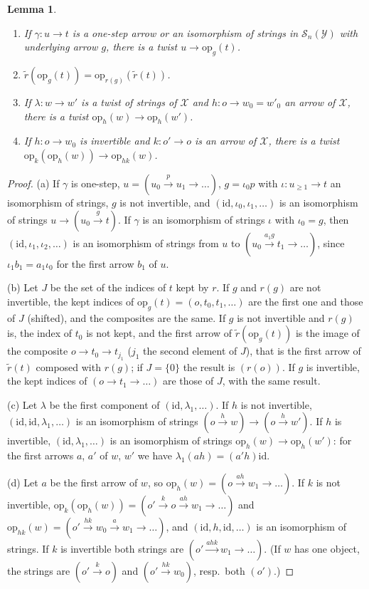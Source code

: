 \documentclass[11pt]{amsart}
\newtheorem{lem}[thm]{Lemma}
\theoremstyle{definition}
\newcommand{\cX}{\mathcal X}
\newcommand{\cS}{\mathcal S}
\newcommand{\id}{\mathrm{id}}
\newcommand{\opn}{\mathrm{op}}
\newcommand{\cY}{\mathcal Y}
\begin{document}
\begin{lem}\label{lem:op}
\begin{enumerate}
\item[(a)] If $\gamma\colon u\to t$ is a one-step arrow or an
isomorphism of strings in $\cS_n(\cY)$ with underlying arrow $g$, there
is a twist $u\to\opn_g(t)$.
\item[(b)] $\tilde r(\opn_g(t))=\opn_{r(g)}(\tilde r(t))$.
\item[(c)] If $\lambda\colon w\to w'$ is a twist of strings of $\cX$
and $h\colon o\to w_0=w'_0$ an arrow of $\cX$, there is a twist
$\opn_h(w)\to\opn_h(w')$.
\item[(d)] If $h\colon o\to w_0$ is invertible and $k\colon o'\to o$
is an arrow of $\cX$, there is a twist $\opn_k(\opn_h(w))\to\opn_{hk}
(w)$.
\end{enumerate}
\end{lem}
\begin{proof}
(a) If $\gamma$ is one-step, $u=(u_0\xrightarrow{p}u_1\to\dots)$,
$g=\iota_0p$ with $\iota\colon u_{\ge1}\to t$ an isomorphism of
strings, $g$ is not invertible, and $(\id,\iota_0,\iota_1,\dots)$ is
an isomorphism of strings $u\to(u_0\xrightarrow{g}t)$. If $\gamma$ is
an isomorphism of strings $\iota$ with $\iota_0=g$, then
$(\id,\iota_1,\iota_2,\dots)$ is an isomorphism of strings from $u$
to $(u_0\xrightarrow{a_1g}t_1\to\dots)$, since $\iota_1b_1=a_1\iota_0$
for the first arrow $b_1$ of $u$.

(b) Let $J$ be the set of the indices of $t$ kept by $r$. If $g$ and
$r(g)$ are not invertible, the kept indices of $\opn_g(t)=(o,t_0,t_1,
\dots)$ are the first one and those of $J$ (shifted), and the
composites are the same. If $g$ is not invertible and $r(g)$ is, the
index of $t_0$ is not kept, and the first arrow of $\tilde r(\opn_g
(t))$ is the image of the composite $o\to t_0\to t_{j_1}$ ($j_1$ the
second element of $J$), that is the first arrow of $\tilde r(t)$
composed with $r(g)$; if $J=\{0\}$ the result is $(r(o))$. If $g$ is
invertible, the kept indices of $(o\to t_1\to\dots)$ are those of
$J$, with the same result.

(c) Let $\lambda$ be the first component of $(\id,\lambda_1,\dots)$.
If $h$ is not invertible, $(\id,\id,\lambda_1,\dots)$ is an
isomorphism of strings $(o\xrightarrow{h}w)\to(o\xrightarrow{h}w')$.
If $h$ is invertible, $(\id,\lambda_1,\dots)$ is an isomorphism of
strings $\opn_h(w)\to\opn_h(w')$: for the first arrows $a$, $a'$ of
$w$, $w'$ we have $\lambda_1(ah)=(a'h)\id$.

(d) Let $a$ be the first arrow of $w$, so $\opn_h(w)=(o\xrightarrow{ah}
w_1\to\dots)$. If $k$ is not invertible, $\opn_k(\opn_h(w))=(o'
\xrightarrow{k}o\xrightarrow{ah}w_1\to\dots)$ and $\opn_{hk}(w)=(o'
\xrightarrow{hk}w_0\xrightarrow{a}w_1\to\dots)$, and
$(\id,h,\id,\dots)$ is an isomorphism of strings. If $k$ is
invertible both strings are $(o'\xrightarrow{ahk}w_1\to\dots)$. (If
$w$ has one object, the strings are $(o'\xrightarrow{k}o)$ and
$(o'\xrightarrow{hk}w_0)$, resp.\ both $(o')$.)
\end{proof}
\end{document}

